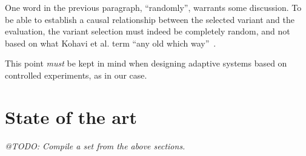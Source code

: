 One word in the previous paragraph, ``randomly'', warrants some discussion. To be able to establish a causal relationship between the selected variant and the evaluation, the variant selection must indeed be completely random, and not based on what Kohavi et al. term ``any old which way''~\cite{Kohavi2007}.

This point \emph{must} be kept in mind when designing adaptive systems based on controlled experiments, as in our case.

\section{State of the art}
\label{survey:sub:state_of_the_art}

\emph{@TODO: Compile a set from the above sections.}
